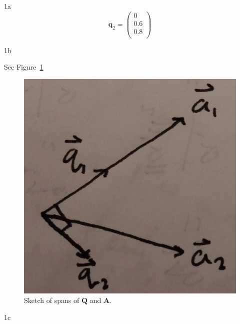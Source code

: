 \documentclass{article}
\begin{document}
\begin{homeworkProblem}
\begin{homeworkSection}{1a}
        \begin{equation*}
            \bm{q}_2 = \left(\begin{matrix} 0\\0.6\\0.8\\\end{matrix}\right)
        \end{equation*}

    \end{homeworkSection}

    \begin{homeworkSection}{1b}

        See Figure~\ref{fig:1}

        \begin{figure}[!ht]
        \begin{centering}
            \includegraphics[scale=0.07]{problem1b_fig.png}

            \caption{\label{fig:1} Sketch of spans of $\bm{Q}$ and $\bm{A}$.}

        \end{centering}
        \end{figure}

    \end{homeworkSection}

    \begin{homeworkSection}{1c}


\end{homeworkSection}
\end{homeworkProblem}
\end{document}
